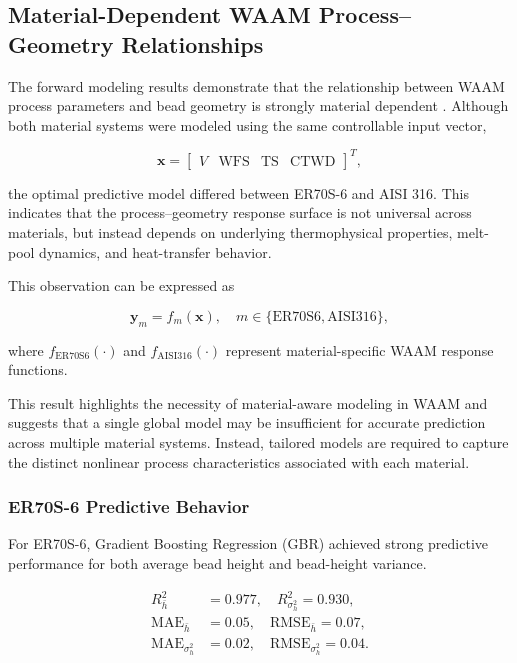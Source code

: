 \documentclass[11pt]{article}
\begin{document}
\subsection{Material-Dependent WAAM Process--Geometry Relationships}

The forward modeling results demonstrate that the relationship between WAAM process parameters and bead geometry is strongly material dependent \cite{Wani2024,Karmuhilan2018}. Although both material systems were modeled using the same controllable input vector,

\begin{equation}
\mathbf{x} =
\begin{bmatrix}
V & \mathrm{WFS} & \mathrm{TS} & \mathrm{CTWD}
\end{bmatrix}^{T},
\end{equation}

the optimal predictive model differed between ER70S-6 and AISI 316. This indicates that the process--geometry response surface is not universal across materials, but instead depends on underlying thermophysical properties, melt-pool dynamics, and heat-transfer behavior.

This observation can be expressed as

\begin{equation}
\mathbf{y}_{m} = f_{m}(\mathbf{x}),
\quad
m \in \{\mathrm{ER70S6}, \mathrm{AISI316}\},
\end{equation}

where $f_{\mathrm{ER70S6}}(\cdot)$ and $f_{\mathrm{AISI316}}(\cdot)$ represent material-specific WAAM response functions.

This result highlights the necessity of material-aware modeling in WAAM and suggests that a single global model may be insufficient for accurate prediction across multiple material systems. Instead, tailored models are required to capture the distinct nonlinear process characteristics associated with each material.

\subsubsection{ER70S-6 Predictive Behavior}

For ER70S-6, Gradient Boosting Regression (GBR) achieved strong predictive performance for both average bead height and bead-height variance.

\begin{tcolorbox}[colback=white,colframe=black,boxrule=0.5pt,arc=2pt]
\small
\begin{equation}
\begin{aligned}
R^{2}_{\bar{h}} &= 0.977, \quad
R^{2}_{\sigma_h^2} = 0.930, \\
\mathrm{MAE}_{\bar{h}} &= 0.05, \quad
\mathrm{RMSE}_{\bar{h}} = 0.07, \\
\mathrm{MAE}_{\sigma_h^2} &= 0.02, \quad
\mathrm{RMSE}_{\sigma_h^2} = 0.04.
\end{aligned}
\end{equation}
\end{tcolorbox}
\end{document}

